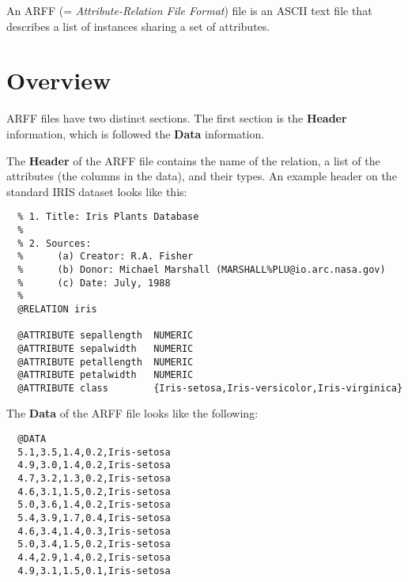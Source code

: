 %
%
%
%


An ARFF (= \textit{Attribute-Relation File Format}) file is an ASCII text file that describes a list of instances sharing a set of attributes.

\section{Overview}
ARFF files have two distinct sections. The first section is the \textbf{Header} information, which is followed the \textbf{Data} information.

The \textbf{Header} of the ARFF file contains the name of the relation, a list of the attributes (the columns in the data), and their types. An example header on the standard IRIS dataset looks like this:

\begin{verbatim}
  % 1. Title: Iris Plants Database
  % 
  % 2. Sources:
  %      (a) Creator: R.A. Fisher
  %      (b) Donor: Michael Marshall (MARSHALL%PLU@io.arc.nasa.gov)
  %      (c) Date: July, 1988
  % 
  @RELATION iris

  @ATTRIBUTE sepallength  NUMERIC
  @ATTRIBUTE sepalwidth   NUMERIC
  @ATTRIBUTE petallength  NUMERIC
  @ATTRIBUTE petalwidth   NUMERIC
  @ATTRIBUTE class        {Iris-setosa,Iris-versicolor,Iris-virginica}
\end{verbatim}

\noindent The \textbf{Data} of the ARFF file looks like the following:

\begin{verbatim}
  @DATA
  5.1,3.5,1.4,0.2,Iris-setosa
  4.9,3.0,1.4,0.2,Iris-setosa
  4.7,3.2,1.3,0.2,Iris-setosa
  4.6,3.1,1.5,0.2,Iris-setosa
  5.0,3.6,1.4,0.2,Iris-setosa
  5.4,3.9,1.7,0.4,Iris-setosa
  4.6,3.4,1.4,0.3,Iris-setosa
  5.0,3.4,1.5,0.2,Iris-setosa
  4.4,2.9,1.4,0.2,Iris-setosa
  4.9,3.1,1.5,0.1,Iris-setosa
\end{verbatim}

